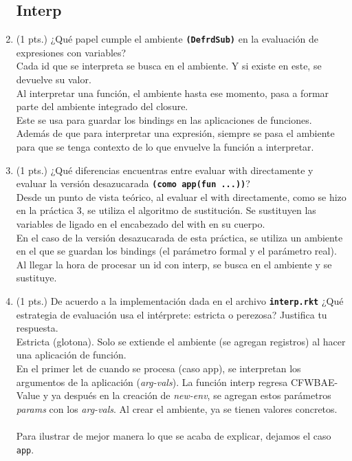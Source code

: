 \documentclass[11pt]{article}
\begin{document}
\begin{enumerate}
    \subsection{Interp}
    \item (1 pts.) ¿Qué papel cumple el ambiente \texttt{\textbf{(DefrdSub)}} en la evaluación de expresiones con variables?\\
    Cada id que se interpreta se busca en el ambiente. Y si existe en este, se devuelve su valor.\\
    Al interpretar una función, el ambiente hasta ese momento, pasa a formar parte del ambiente integrado del closure.\\
    Este se usa para guardar los bindings en las aplicaciones de funciones.
    Además de que para interpretar una expresión, siempre se pasa el ambiente para que se tenga contexto de lo que envuelve la función a interpretar.
    \item (1 pts.) ¿Qué diferencias encuentras entre evaluar with directamente y evaluar la versión desazucarada \texttt{\textbf{(como app(fun ...))}}?\\
    Desde un punto de vista teórico, al evaluar el with directamente, como se hizo en la práctica 3, se utiliza el algoritmo de sustitución. Se sustituyen las variables de ligado en el encabezado del with en su cuerpo.\\
    En el caso de la versión desazucarada de esta práctica, se utiliza un ambiente en el que se guardan los bindings (el parámetro formal y el parámetro real). Al llegar la hora de procesar un id con interp, se busca en el ambiente y se sustituye.
    \item (1 pts.) De acuerdo a la implementación dada en el archivo \texttt{\textbf{interp.rkt}} ¿Qué estrategia de evaluación usa el intérprete: estricta o perezosa? Justifica tu respuesta.\\
      Estricta (glotona).
      Solo se extiende el ambiente (se agregan registros) al hacer una aplicación de función.\\En el primer let de cuando se procesa (caso app), se interpretan los argumentos de la aplicación (\textit{arg-vals}). La función interp regresa CFWBAE-Value y ya después en la creación de \textit{new-env}, se agregan estos parámetros \textit{params} con los \textit{arg-vals}. Al crear el ambiente, ya se tienen valores concretos.\\\\
      Para ilustrar de mejor manera lo que se acaba de explicar, dejamos el caso \texttt{app}.

\end{enumerate}
\end{document}
